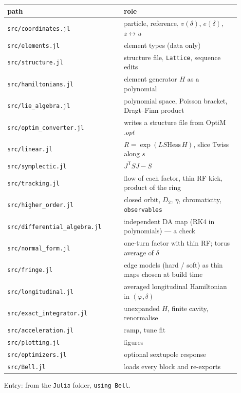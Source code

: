 \documentclass[11pt,a4paper]{article}
\begin{document}
\begin{center}\small\begin{tabular}{p{0.475\linewidth}p{0.475\linewidth}}\hline
\textbf{path} & \textbf{role}\\\hline
\texttt{src/coordinates.jl} & particle, reference, $v(\delta)$, $e(\delta)$, $z\leftrightarrow u$\\
\texttt{src/elements.jl} & element types (data only)\\
\texttt{src/structure.jl} & structure file, \texttt{Lattice}, sequence edits\\
\texttt{src/hamiltonians.jl} & element generator $H$ as a polynomial\\
\texttt{src/lie\_algebra.jl} & polynomial space, Poisson bracket, Dragt–Finn product\\
\texttt{src/optim\_converter.jl} & writes a structure file from OptiM $.opt$\\
\texttt{src/linear.jl} & $R=\exp(L S \mathrm{Hess}\,H)$, slice Twiss along $s$\\
\texttt{src/symplectic.jl} & $J^\mathsf{T}SJ-S$\\
\texttt{src/tracking.jl} & flow of each factor, thin RF kick, product of the ring\\
\texttt{src/higher\_order.jl} & closed orbit, $D_2$, $\eta$, chromaticity, \texttt{observables}\\
\texttt{src/differential\_algebra.jl} & independent DA map (RK4 in polynomials) — a check\\
\texttt{src/normal\_form.jl} & one-turn factor with thin RF; torus average of $\delta$\\
\texttt{src/fringe.jl} & edge models (hard / soft) as thin maps chosen at build time\\
\texttt{src/longitudinal.jl} & averaged longitudinal Hamiltonian in $(\varphi,\delta)$\\
\texttt{src/exact\_integrator.jl} & unexpanded $H$, finite cavity, renormalise\\
\texttt{src/acceleration.jl} & ramp, tune fit\\
\texttt{src/plotting.jl} & figures\\
\texttt{src/optimizers.jl} & optional sextupole response\\
\texttt{src/Bell.jl} & loads every block and re-exports\\
\hline\end{tabular}\end{center}

Entry: from the \texttt{Julia} folder, \texttt{using Bell}.
\end{document}

